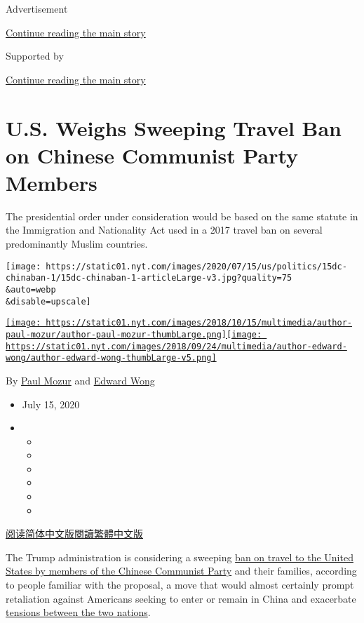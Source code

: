 Advertisement

\protect\hyperlink{after-top}{Continue reading the main story}

Supported by

\protect\hyperlink{after-sponsor}{Continue reading the main story}

\hypertarget{us-weighs-sweeping-travel-ban-on-chinese-communist-party-members}{%
\section{U.S. Weighs Sweeping Travel Ban on Chinese Communist Party
Members}\label{us-weighs-sweeping-travel-ban-on-chinese-communist-party-members}}

The presidential order under consideration would be based on the same
statute in the Immigration and Nationality Act used in a 2017 travel ban
on several predominantly Muslim countries.

\texttt{[image: https://static01.nyt.com/images/2020/07/15/us/politics/15dc-chinaban-1/15dc-chinaban-1-articleLarge-v3.jpg?quality=75\\\&auto=webp\\\&disable=upscale]}

\href{https://www.nytimes.com/by/paul-mozur}{\texttt{[image: https://static01.nyt.com/images/2018/10/15/multimedia/author-paul-mozur/author-paul-mozur-thumbLarge.png]}}\href{https://www.nytimes.com/by/edward-wong}{\texttt{[image: https://static01.nyt.com/images/2018/09/24/multimedia/author-edward-wong/author-edward-wong-thumbLarge-v5.png]}}

By \href{https://www.nytimes.com/by/paul-mozur}{Paul Mozur} and
\href{https://www.nytimes.com/by/edward-wong}{Edward Wong}

\begin{itemize}
\item
  July 15, 2020
\item
  \begin{itemize}
  \item
  \item
  \item
  \item
  \item
  \item
  \end{itemize}
\end{itemize}

\href{https://cn.nytimes.com/usa/20200716/china-travel-ban/}{阅读简体中文版}\href{https://cn.nytimes.com/usa/20200716/china-travel-ban/zh-hant/}{閱讀繁體中文版}

The Trump administration is considering a sweeping
\href{https://www.nytimes.com/2020/07/16/world/asia/china-communist-party-travel-ban-explain.html}{ban
on travel to the United States by members of the Chinese Communist
Party} and their families, according to people familiar with the
proposal, a move that would almost certainly prompt retaliation against
Americans seeking to enter or remain in China and exacerbate
\href{https://www.nytimes.com/2020/07/23/world/asia/us-china-consulate.html}{tensions
between the two nations}.


